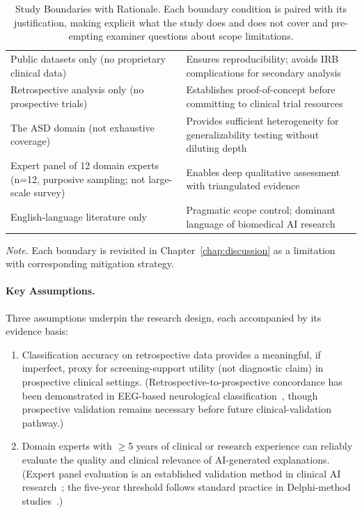 {\tablestripes\tablefontsize

\begin{xltabular}{\textwidth}{@{} L L @{}}
\caption[Study Boundaries with Rationale]{Study Boundaries with Rationale. Each boundary condition is paired with its justification, making explicit what the study does and does not cover and pre-empting examiner questions about scope limitations.}\label{tab:study_boundaries} \\
\toprule
{} &  \\
\midrule
\endfirsthead
\endhead
\bottomrule
\endlastfoot
Public datasets only (no proprietary clinical data) & Ensures reproducibility; avoids IRB complications for secondary analysis \\
\addlinespace
Retrospective analysis only (no prospective trials) & Establishes proof-of-concept before committing to clinical trial resources \\
\addlinespace
The ASD domain (not exhaustive coverage) & Provides sufficient heterogeneity for generalizability testing without diluting depth \\
\addlinespace
Expert panel of 12 domain experts (n=12, purposive sampling; not large-scale survey) & Enables deep qualitative assessment with triangulated evidence \\
\addlinespace
English-language literature only & Pragmatic scope control; dominant language of biomedical AI research \\
\end{xltabular}}
\vspace{0.5em}
\noindent\textit{Note.} Each boundary is revisited in Chapter~\ref{chap:discussion} as a limitation with corresponding mitigation strategy.

\paragraph{Key Assumptions.}
Three assumptions underpin the research design, each accompanied by its evidence basis:
\begin{enumerate}
    \item Classification accuracy on retrospective data provides a meaningful, if imperfect, proxy for screening-support utility (not diagnostic claim) in prospective clinical settings. (Retrospective-to-prospective concordance has been demonstrated in EEG-based neurological classification~\cite{acharya2018deep, boonyakitanont2020review}, though prospective validation remains necessary before future clinical-validation pathway.)
    \item Domain experts with $\geq$5 years of clinical or research experience can reliably evaluate the quality and clinical relevance of AI-generated explanations. (Expert panel evaluation is an established validation method in clinical AI research~\cite{tonekaboni2019clinicians}; the five-year threshold follows standard practice in Delphi-method studies~\cite{hsu2007delphi}.)
\end{enumerate}

